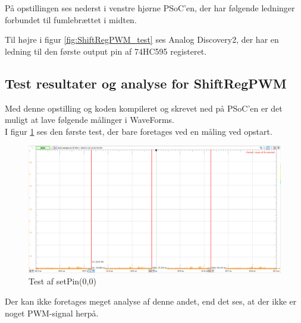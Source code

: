 \documentclass[Modultest/Modultest_main.tex]{subfiles}
\begin{document}
På opstillingen ses nederst i venstre hjørne PSoC'en, der har følgende ledninger forbundet til fumlebrættet i midten.

\begin{table}[H]
\end{table}

Til højre i figur \ref{fig:ShiftRegPWM_test} ses Analog Discovery2, der har en ledning til den første output pin af 74HC595 registeret.

\subsection{Test resultater og analyse for ShiftRegPWM}

Med denne opstilling og koden kompileret og skrevet ned på PSoC'en er det muligt at lave følgende målinger i WaveForms.
\\I figur \ref{fig:test_0_pin_0} ses den første test, der bare foretages ved en måling ved opstart.

\begin{figure}[H]
    \centering
    \includegraphics[width=\textwidth]{Modultest/CupLight/graphics/pwm_0.png}
    \caption{Test af setPin(0,0)}
    \label{fig:test_0_pin_0}
\end{figure}
Der kan ikke foretages meget analyse af denne andet, end det ses, at der ikke er noget PWM-signal herpå.
\end{document}
